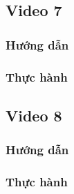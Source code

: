 \documentclass{article}
\begin{document}
\subsection{Video 7}
\subsubsection{Hướng dẫn}

\subsubsection{Thực hành}




\subsection{Video 8}
\subsubsection{Hướng dẫn}

\subsubsection{Thực hành}








\end{document}
